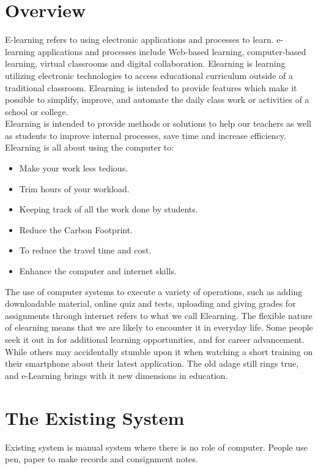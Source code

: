 \section{Overview}
E-learning refers to using electronic applications and processes to learn. e-learning applications and processes include Web-based learning, computer-based learning, virtual classrooms and digital collaboration. Elearning is learning utilizing electronic technologies to access educational curriculum outside of a traditional classroom. Elearning is intended to provide features which make it possible to simplify, improve,
and automate the daily class work or activities of a school or college.\\

\noindent Elearning is intended to provide methods or solutions to help our teachers as well as students to improve internal processes, save time and increase efficiency. 
Elearning is all about using the computer to:
\begin{itemize}
\item Make your work less tedious.
\item Trim hours of your workload.
\item Keeping track of all the work done by students.
\item Reduce the Carbon Footprint.
\item To reduce the travel time and cost.
\item Enhance the computer and internet skills.
\end{itemize}
The use of computer systems to execute a variety of operations, such as adding downloadable material,
online quiz and tests, uploading and giving grades for assignments through internet refers to what we call Elearning. The flexible nature of elearning means that we are likely to encounter it in everyday life. Some people seek it out in for additional learning opportunities, and for career advancement. While others may accidentally stumble upon it when watching a short training on their smartphone about their latest application. The old adage still rings true, and e-Learning brings with it new dimensions in education.

\section{The Existing System}
Existing system is manual system where there is no role of computer. 
People use pen, paper to make records and consignment notes.\\

